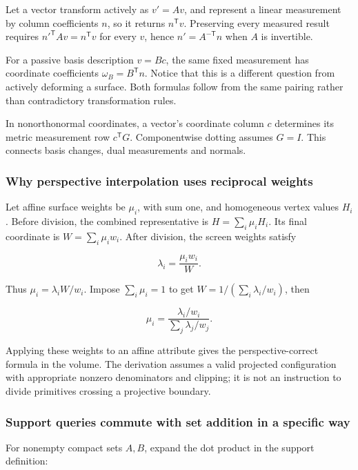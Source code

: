 Let a vector transform actively as \(v'=Av\), and represent a linear measurement by column coefficients \(n\), so it returns \(n^\mathsf Tv\). Preserving every measured result requires \(n'^\mathsf TAv=n^\mathsf Tv\) for every \(v\), hence \(n'=A^{-\mathsf T}n\) when \(A\) is invertible.

For a passive basis description \(v=Bc\), the same fixed measurement has coordinate coefficients \(\omega_B=B^\mathsf Tn\). Notice that this is a different question from actively deforming a surface. Both formulas follow from the same pairing rather than contradictory transformation rules.

In nonorthonormal coordinates, a vector's coordinate column \(c\) determines its metric measurement row \(c^\mathsf TG\). Componentwise dotting assumes \(G=I\). This connects basis changes, dual measurements and normals.

\subsubsection{Why perspective interpolation uses reciprocal weights}\label{02-foundations-ii-ch039-why-perspective-interpolation-uses-reciprocal-weights}

Let affine surface weights be \(\mu_i\), with sum one, and homogeneous vertex values \(H_i\). Before division, the combined representative is \(H=\sum_i\mu_iH_i\). Its final coordinate is \(W=\sum_i\mu_iw_i\). After division, the screen weights satisfy

\[
\lambda_i=\frac{\mu_iw_i}{W}.
\]

Thus \(\mu_i=\lambda_iW/w_i\). Impose \(\sum_i\mu_i=1\) to get \(W=1/(\sum_i\lambda_i/w_i)\), then

\[
\mu_i=\frac{\lambda_i/w_i}{\sum_j\lambda_j/w_j}.
\]

Applying these weights to an affine attribute gives the perspective-correct formula in the volume. The derivation assumes a valid projected configuration with appropriate nonzero denominators and clipping; it is not an instruction to divide primitives crossing a projective boundary.

\subsubsection{Support queries commute with set addition in a specific way}\label{02-foundations-ii-ch039-support-queries-commute-with-set-addition-in-a-specific-way}

For nonempty compact sets \(A,B\), expand the dot product in the support definition:

